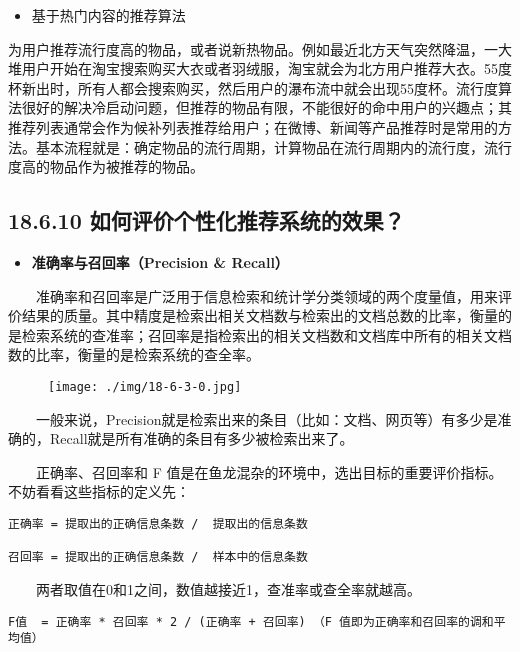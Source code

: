 \begin{itemize}
\item
  基于热门内容的推荐算法
\end{itemize}

​
为用户推荐流行度高的物品，或者说新热物品。例如最近北方天气突然降温，一大堆用户开始在淘宝搜索购买大衣或者羽绒服，淘宝就会为北方用户推荐大衣。55度杯新出时，所有人都会搜索购买，然后用户的瀑布流中就会出现55度杯。流行度算法很好的解决冷启动问题，但推荐的物品有限，不能很好的命中用户的兴趣点；其推荐列表通常会作为候补列表推荐给用户；在微博、新闻等产品推荐时是常用的方法。基本流程就是：确定物品的流行周期，计算物品在流行周期内的流行度，流行度高的物品作为被推荐的物品。

\subsection{18.6.10
如何评价个性化推荐系统的效果？}\label{ux5982ux4f55ux8bc4ux4ef7ux4e2aux6027ux5316ux63a8ux8350ux7cfbux7edfux7684ux6548ux679c}

\begin{itemize}
\item
  \textbf{准确率与召回率（Precision \& Recall）}
\end{itemize}

  准确率和召回率是广泛用于信息检索和统计学分类领域的两个度量值，用来评价结果的质量。其中精度是检索出相关文档数与检索出的文档总数的比率，衡量的是检索系统的查准率；召回率是指检索出的相关文档数和文档库中所有的相关文档数的比率，衡量的是检索系统的查全率。

\begin{figure}
\centering
\texttt{[image: ./img/18-6-3-0.jpg]}
\caption{}
\end{figure}

  一般来说，Precision就是检索出来的条目（比如：文档、网页等）有多少是准确的，Recall就是所有准确的条目有多少被检索出来了。

  正确率、召回率和 F
值是在鱼龙混杂的环境中，选出目标的重要评价指标。不妨看看这些指标的定义先：

\begin{verbatim}
正确率 = 提取出的正确信息条数 /  提取出的信息条数 

召回率 = 提取出的正确信息条数 /  样本中的信息条数    
\end{verbatim}

  两者取值在0和1之间，数值越接近1，查准率或查全率就越高。

\begin{verbatim}
F值  = 正确率 * 召回率 * 2 / (正确率 + 召回率) （F 值即为正确率和召回率的调和平均值）
\end{verbatim}

